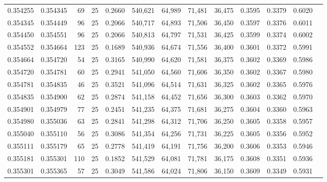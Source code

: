 \begin{tabular}{rrrrrrrrrrrrr}
0.354255 & 0.354345 &    69 &  25 &                                     0.2660 & 540,621 &  64,989 &  71,481 &  36,475 & 0.3595 & 0.3379 & 0.6020 \\
0.354345 & 0.354449 &    96 &  25 &                                     0.2066 & 540,717 &  64,893 &  71,506 &  36,450 & 0.3597 & 0.3376 & 0.6011 \\
0.354450 & 0.354551 &    96 &  25 &                                     0.2066 & 540,813 &  64,797 &  71,531 &  36,425 & 0.3599 & 0.3374 & 0.6002 \\
0.354552 & 0.354664 &   123 &  25 &                                     0.1689 & 540,936 &  64,674 &  71,556 &  36,400 & 0.3601 & 0.3372 & 0.5991 \\
0.354664 & 0.354720 &    54 &  25 &                                     0.3165 & 540,990 &  64,620 &  71,581 &  36,375 & 0.3602 & 0.3369 & 0.5986 \\
0.354720 & 0.354781 &    60 &  25 &                                     0.2941 & 541,050 &  64,560 &  71,606 &  36,350 & 0.3602 & 0.3367 & 0.5980 \\
0.354781 & 0.354835 &    46 &  25 &                                     0.3521 & 541,096 &  64,514 &  71,631 &  36,325 & 0.3602 & 0.3365 & 0.5976 \\
0.354835 & 0.354900 &    62 &  25 &                                     0.2874 & 541,158 &  64,452 &  71,656 &  36,300 & 0.3603 & 0.3362 & 0.5970 \\
0.354901 & 0.354979 &    77 &  25 &                                     0.2451 & 541,235 &  64,375 &  71,681 &  36,275 & 0.3604 & 0.3360 & 0.5963 \\
0.354980 & 0.355036 &    63 &  25 &                                     0.2841 & 541,298 &  64,312 &  71,706 &  36,250 & 0.3605 & 0.3358 & 0.5957 \\
0.355040 & 0.355110 &    56 &  25 &                                     0.3086 & 541,354 &  64,256 &  71,731 &  36,225 & 0.3605 & 0.3356 & 0.5952 \\
0.355111 & 0.355179 &    65 &  25 &                                     0.2778 & 541,419 &  64,191 &  71,756 &  36,200 & 0.3606 & 0.3353 & 0.5946 \\
0.355181 & 0.355301 &   110 &  25 &                                     0.1852 & 541,529 &  64,081 &  71,781 &  36,175 & 0.3608 & 0.3351 & 0.5936 \\
0.355301 & 0.355365 &    57 &  25 &                                     0.3049 & 541,586 &  64,024 &  71,806 &  36,150 & 0.3609 & 0.3349 & 0.5931 \\

\end{tabular}
